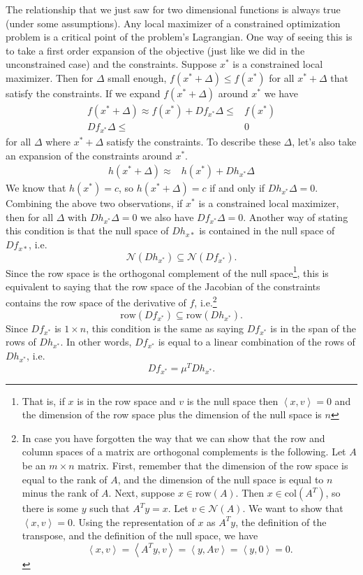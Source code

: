 \documentclass[12pt,reqno]{amsart}
\theoremstyle{definition}
\newcommand{\iprod}[2]{\left\langle {#1} , {#2} \right\rangle}
\begin{document}
The relationship that we just saw for two dimensional functions is
always true (under some assumptions). Any local maximizer of
a constrained optimization problem is a critical point of the
problem's Lagrangian. One way of seeing this is to take a first order
expansion of the objective (just like we did in the unconstrained
case) and the constraints. Suppose $x^*$ is a constrained local
maximizer. Then for $\Delta$ small enough, $f(x^* + \Delta) \leq
f(x^*)$ for all $x^*+ \Delta$ that satisfy the constraints. If we
expand $f(x^*+\Delta)$ around $x^*$ we have
\begin{align*}
  f(x^*+\Delta) \approx f(x^*) + Df_{x^*} \Delta \leq & f(x^*) \\
  Df_{x^*} \Delta \leq & 0 
\end{align*}
for all $\Delta$ where $x^* + \Delta$ satisfy the constraints. To describe these
$\Delta$, let's also take an expansion of the constraints around $x^*$.
\begin{align*}
  h(x^* + \Delta) \approx & h(x^*) + Dh_{x^*} \Delta
\end{align*}
We know that $h(x^*) = c$, so $h(x^* + \Delta) = c$ if and only if
$Dh_{x^*} \Delta = 0$. Combining the above two observations, if $x^*$
is a constrained local maximizer, then for all $\Delta$ with $Dh_{x^*}
\Delta = 0$ we also have $Df_{x^*} \Delta  = 0$. Another way of
stating this condition is that the null space of $Dh_{x*}$ is
contained in the null space of $Df_{x*}$, i.e.
\[ \mathcal{N}(Dh_{x^*}) \subseteq \mathcal{N}(Df_{x^*}). \] Since the
row space is the orthogonal complement of the null space\footnote{That
  is, if $x$ is in the row space and $v$ is the null space then
  $\iprod{x}{v} = 0$ and the dimension of the row space plus the
  dimension of the null space is $n$}, this is equivalent to saying
that the row space of the Jacobian of the constraints contains the row
space of the derivative of $f$, i.e.\footnote{In case you have
  forgotten the way that we can show that the row and column spaces of
  a matrix are orthogonal complements is the following. Let $A$ be an
  $m \times n$ matrix. First, remember that the dimension of the row
  space is equal to the rank of $A$, and the dimension of the null
  space is equal to $n$ minus the rank of $A$. Next, suppose $x \in
  \mathrm{row}(A)$. Then $x \in \mathrm{col}(A^T)$, so there is some
  $y$ such that $A^T y = x$. Let $v \in \mathcal{N}(A)$. We want to
  show that $\iprod{x}{v} = 0$. Using the representation of $x$ as
  $A^T y$, the definition of the transpose, and the definition of the
  null space, we have
  \[ \iprod{x}{v} = \iprod{A^T y}{v} = \iprod{y}{A v} = \iprod{y}{0} =
  0. \]
}
\[ \mathrm{row}(Df_{x^*}) \subseteq \mathrm{row}(Dh_{x^*}). \]
Since $Df_{x^*}$ is $1 \times n$,  this condition is the same as
saying $Df_{x^*}$ is in the span of the rows of $Dh_{x^*}$. In other
words, $Df_{x^*}$ is equal to a linear combination of the rows of
$Dh_{x^*}$, i.e. 
\[ Df_{x^*} = \mu^T Dh_{x^*}. \]
\end{document}
